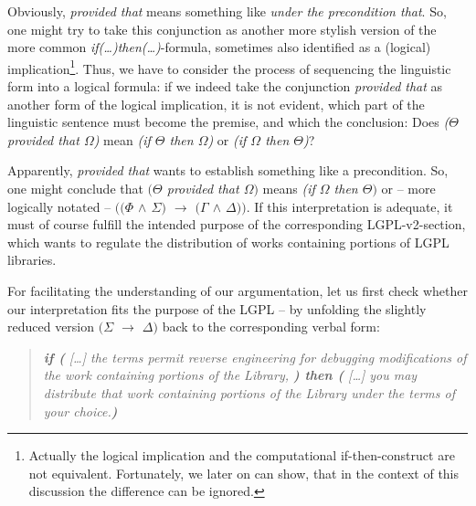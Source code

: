 Obviously, \emph{provided that} means something like \emph{under the
precondition that}. So, one might try to take this conjunction as another more
stylish version of the more common \emph{if(\ldots)then(\ldots)}-formula,
sometimes also identified as a (logical) implication\footnote{Actually the
logical implication and the computational if-then-construct are not equivalent.
Fortunately, we later on can show, that in the context of this discussion the
difference can be ignored.}. Thus, we have to consider the process of sequencing
the linguistic form into a logical formula: if we indeed take the conjunction
\emph{provided that} as another form of the logical implication, it is not
evident, which part of the linguistic sentence must become the premise, and
which the conclusion: Does \emph{($\Theta$ provided that $\Omega$)} mean
\emph{(if $\Theta$ then $\Omega$)} or \emph{(if $\Omega$ then $\Theta$)}?

Apparently, \emph{provided that} wants to establish something like a
precondition. So, one might conclude that \emph{$(\Theta$ provided that
$\Omega)$} means \emph{(if $\Omega$ then $\Theta)$} or -- more logically notated
-- \emph{$((\Phi$ $\wedge$ $\Sigma)$ $\rightarrow$ $(\Gamma$ $\wedge$
$\Delta))$}. If this interpretation is adequate, it must of course fulfill the
intended purpose of the corresponding LGPL-v2-section, which wants to regulate
the distribution of works containing portions of LGPL libraries.

For facilitating the understanding of our argumentation, let us first check
whether our interpretation fits the purpose of the LGPL -- by unfolding the
slightly reduced version \emph{$(\Sigma$ $\rightarrow$ $\Delta)$} back to the
corresponding verbal form:

\begin{quote}\noindent\emph{\textbf{if (} [\ldots] the terms permit reverse
engineering for debugging modifications of the work containing portions of the
Library, \textbf{) then (} [\ldots] you may distribute that work containing
portions of the Library under the terms of your choice.\textbf{)}}\end{quote}

